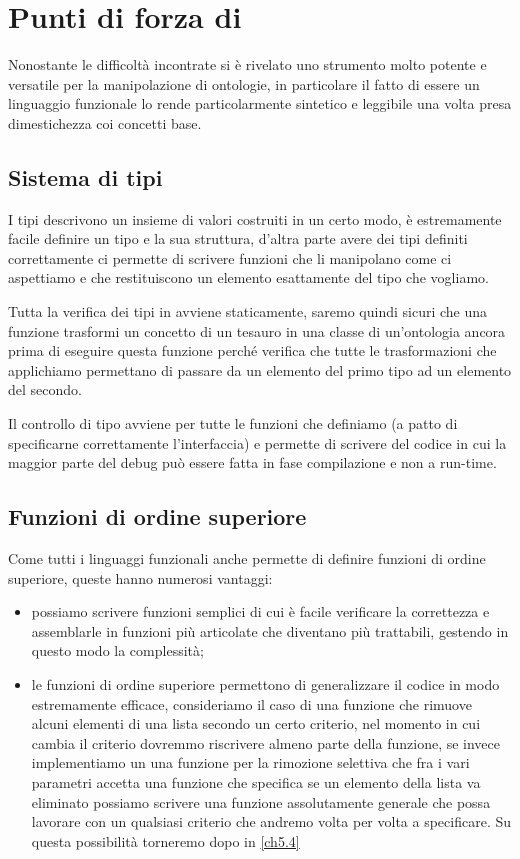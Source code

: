 \section{Punti di forza di \cduce}
Nonostante le difficoltà incontrate \cduce si è rivelato uno strumento molto potente e versatile per la manipolazione di ontologie, in particolare il fatto di essere un linguaggio funzionale lo rende particolarmente sintetico e leggibile una volta presa dimestichezza coi concetti base.
\subsection{Sistema di tipi}
I tipi descrivono un insieme di valori costruiti in un certo modo, è estremamente facile definire un tipo e la sua struttura, d'altra parte avere dei tipi definiti correttamente ci permette di scrivere funzioni che li manipolano come ci aspettiamo e che restituiscono un elemento esattamente del tipo che vogliamo.

Tutta la verifica dei tipi in \cduce avviene staticamente, saremo quindi sicuri che una funzione trasformi un concetto di un tesauro in una classe di un'ontologia ancora prima di eseguire questa funzione perché \cduce verifica che tutte le trasformazioni che applichiamo permettano di passare da un elemento del primo tipo ad un elemento del secondo.

Il controllo di tipo avviene per tutte le funzioni che definiamo (a patto di specificarne correttamente l'interfaccia) e permette di scrivere del codice in cui la maggior parte del debug può essere fatta in fase compilazione e non a run-time. 

\subsection{Funzioni di ordine superiore}
Come tutti i linguaggi funzionali anche \cduce permette di definire funzioni di ordine superiore, queste hanno numerosi vantaggi: 
\begin{itemize}
	\item possiamo scrivere funzioni semplici di cui è facile verificare la correttezza e assemblarle in funzioni più articolate che diventano più trattabili, gestendo in questo modo la complessità;
	\item le funzioni di ordine superiore permettono di generalizzare il codice in modo estremamente efficace, consideriamo il caso di una funzione che rimuove alcuni elementi di una lista secondo un certo criterio, nel momento in cui cambia il criterio dovremmo riscrivere almeno parte della funzione, se invece implementiamo un una funzione per la rimozione selettiva che fra i vari parametri accetta una funzione che specifica se un elemento della lista va eliminato possiamo scrivere una funzione assolutamente generale che possa lavorare con un qualsiasi criterio che andremo volta per volta a specificare. Su questa possibilità torneremo dopo in \ref{ch5.4}
\end{itemize}
